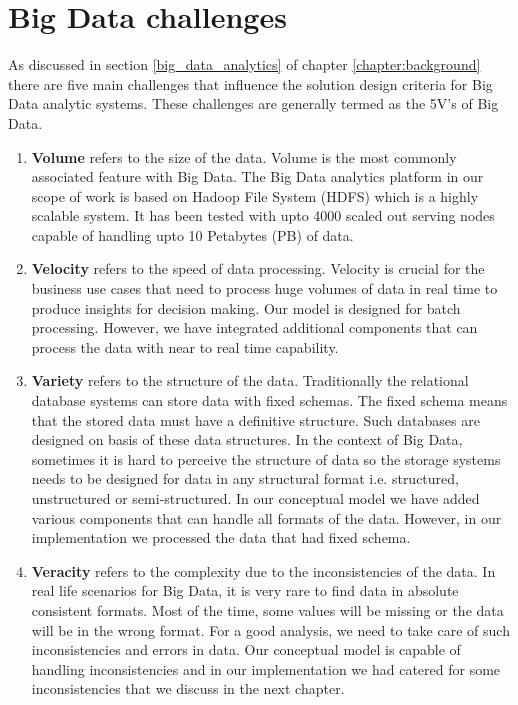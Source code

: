 \section{Big Data challenges}
As discussed in section \ref{big_data_analytics} of chapter \ref{chapter:background} there are five main challenges that influence the solution design criteria for Big Data analytic systems. These challenges are generally termed as the 5V's of Big Data.
\begin{enumerate}
\item \textbf{Volume} refers to the size of the data. Volume is the most commonly associated feature with Big Data. The Big Data analytics platform in our scope of work is based on Hadoop File System (HDFS) which is a highly scalable system. It has been tested with upto 4000 scaled out serving nodes capable of handling upto 10 Petabytes (PB) of data.
\item \textbf{Velocity} refers to the speed of data processing. Velocity is crucial for the business use cases that need to process huge volumes of data in real time to produce insights for decision making. Our model is designed for batch processing. However, we have integrated additional components that can process the data with near to real time capability.
\item \textbf{Variety} refers to the structure of the data. Traditionally the relational database systems can store data with fixed schemas. The fixed schema means that the stored data must have a definitive structure. Such databases are designed on basis of these data structures. In the context of Big Data, sometimes it is hard to perceive the structure of data so the storage systems needs to be designed for data in any structural format i.e. structured, unstructured or semi-structured. In our conceptual model we have added various components that can handle all formats of the data. However, in our implementation we processed the data that had fixed schema. 
\item \textbf{Veracity} refers to the complexity due to the inconsistencies of the data. In real life scenarios for Big Data, it is very rare to find data in absolute consistent formats. Most of the time, some values will be missing or the data will be in the wrong format. For a good analysis, we need to take care of such inconsistencies and errors in data. Our conceptual model is capable of handling inconsistencies and in our implementation we had catered for some inconsistencies that we discuss in the next chapter. 

\end{enumerate}
